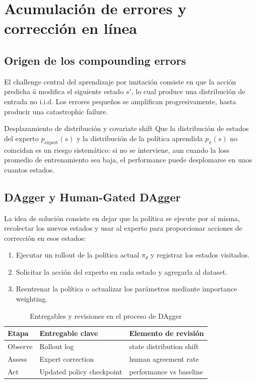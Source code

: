 \section{Acumulación de errores y corrección en línea}

\subsection{Origen de los compounding errors}

El challenge central del aprendizaje por imitación consiste en que la acción predicha $\hat{a}$ modifica el siguiente estado $s'$, lo cual produce una distribución de entrada no i.i.d. Los errores pequeños se amplifican progresivamente, hasta producir una catastrophic failure.

\begin{warningbox}{Desplazamiento de distribución y covariate shift}
Que la distribución de estados del experto $p_{\text{expert}}(s)$ y la distribución de la política aprendida $p_{\pi}(s)$ no coincidan es un riesgo sistemático: si no se interviene, aun cuando la loss promedio de entrenamiento sea baja, el performance puede desplomarse en unos cuantos estados.
\end{warningbox}

\subsection{DAgger y Human-Gated DAgger}

La idea de solución consiste en dejar que la política se ejecute por sí misma, recolectar los nuevos estados y usar al experto para proporcionar acciones de corrección en esos estados:
\begin{enumerate}
    \item Ejecutar un rollout de la política actual $\pi_\theta$ y registrar los estados visitados.
    \item Solicitar la acción del experto en cada estado y agregarla al dataset.
    \item Reentrenar la política o actualizar los parámetros mediante importance weighting.
\end{enumerate}

\begin{table}[H]
\centering
\begin{tabular}{p{} p{} p{}}
\toprule
Etapa & Entregable clave & Elemento de revisión \\
\midrule
Observe & Rollout log & state distribution shift \\
Assess & Expert correction & human agreement rate \\
Act & Updated policy checkpoint & performance vs baseline \\
\bottomrule
\end{tabular}
\caption{Entregables y revisiones en el proceso de DAgger}
\end{table}

